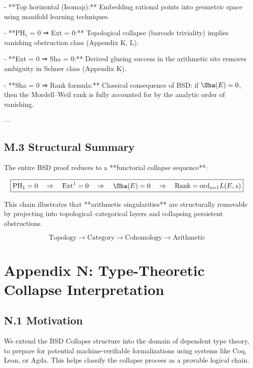 - **Top horizontal (Isomap):**  
  Embedding rational points into geometric space using manifold learning techniques.

- **PH₁ = 0 ⇒ Ext = 0:**  
  Topological collapse (barcode triviality) implies vanishing obstruction class (Appendix K, L).

- **Ext = 0 ⇒ Sha = 0:**  
  Derived glueing success in the arithmetic site removes ambiguity in Selmer class (Appendix K).

- **Sha = 0 ⇒ Rank formula:**  
  Classical consequence of BSD: if \( \Sha(E) = 0 \), then the Mordell–Weil rank is fully accounted for by the analytic order of vanishing.

---

\subsection*{M.3 Structural Summary}

The entire BSD proof reduces to a **functorial collapse sequence**:

\[
\boxed{
\mathrm{PH}_1 = 0 \quad \Rightarrow \quad \mathrm{Ext}^1 = 0 \quad \Rightarrow \quad \Sha(E) = 0 \quad \Rightarrow \quad \text{Rank} = \text{ord}_{s=1} L(E,s)
}
\]

This chain illustrates that **arithmetic singularities** are structurally removable  
by projecting into topological–categorical layers and collapsing persistent obstructions.

\[
\boxed{
\text{Topology} \to \text{Category} \to \text{Cohomology} \to \text{Arithmetic}
}
\]



\section*{Appendix N: Type-Theoretic Collapse Interpretation}

\subsection*{N.1 Motivation}

We extend the BSD Collapse structure into the domain of dependent type theory,  
to prepare for potential machine-verifiable formalizations using systems like Coq, Lean, or Agda.  
This helps classify the collapse process as a provable logical chain.

